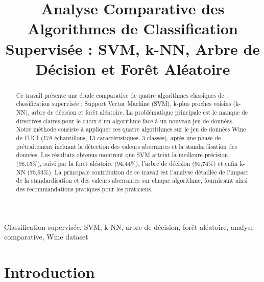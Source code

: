\documentclass[conference]{IEEEtran}
\begin{document}
\title{Analyse Comparative des Algorithmes de Classification Supervisée : SVM, k-NN, Arbre de Décision et Forêt Aléatoire}

\author{
}

\maketitle


\begin{abstract}
Ce travail présente une étude comparative de quatre algorithmes classiques de classification supervisée : Support Vector Machine (SVM), k-plus proches voisins (k-NN), arbre de décision et forêt aléatoire. La problématique principale est le manque de directives claires pour le choix d'un algorithme face à un nouveau jeu de données. Notre méthode consiste à appliquer ces quatre algorithmes sur le jeu de données Wine de l'UCI (178 échantillons, 13 caractéristiques, 3 classes), après une phase de prétraitement incluant la détection des valeurs aberrantes et la standardisation des données. Les résultats obtenus montrent que SVM atteint la meilleure précision (98,15\%), suivi par la forêt aléatoire (94,44\%), l'arbre de décision (90,74\%) et enfin k-NN (75,93\%). La principale contribution de ce travail est l'analyse détaillée de l'impact de la standardisation et des valeurs aberrantes sur chaque algorithme, fournissant ainsi des recommandations pratiques pour les praticiens.
\end{abstract}

\begin{IEEEkeywords}
Classification supervisée, SVM, k-NN, arbre de décision, forêt aléatoire, analyse comparative, Wine dataset
\end{IEEEkeywords}


\section{Introduction}
\end{document}
